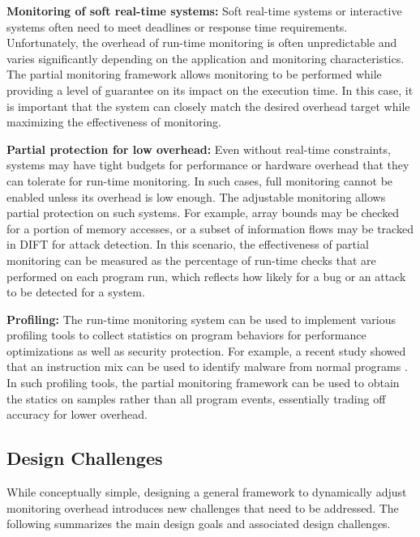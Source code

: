 {\bf Monitoring of soft real-time systems:}
Soft real-time systems or interactive systems often need to meet deadlines or response
time requirements. Unfortunately, the overhead of run-time monitoring is often 
unpredictable and varies significantly depending on the application and monitoring
characteristics. The partial monitoring framework allows monitoring to be performed
while providing a level of guarantee on its impact on the execution time. 
In this case, it is important that the system can closely match the desired
overhead target while maximizing the effectiveness of monitoring.

{\bf Partial protection for low overhead:}
Even without real-time constraints, systems may have tight budgets for performance
or hardware overhead that they can tolerate for run-time monitoring. In such cases,
full monitoring cannot be enabled unless its overhead is low enough. The adjustable
monitoring allows partial protection on such systems. For example, array bounds
may be checked for a portion of memory accesses, or a subset of information flows
may be tracked in DIFT for attack detection. In this scenario, the effectiveness of 
partial monitoring can be measured as the percentage of run-time checks that are
performed on each program run, which reflects how likely for a bug or an attack 
to be detected for a system. 

{\bf Profiling:} 
The run-time monitoring system can be used to implement various profiling tools
to collect statistics on program behaviors for performance optimizations as well
as security protection. For example, a recent study showed that an instruction
mix can be used to identify malware from normal programs \cite{FIXME}. 
In such profiling tools, the partial monitoring framework can be used to obtain
the statics on samples rather than all program events, essentially trading off
accuracy for lower overhead.

\subsection{Design Challenges}

While conceptually simple, designing a general framework to dynamically adjust monitoring
overhead introduces new challenges that need to be addressed.  
The following summarizes the main design goals and associated design challenges.

